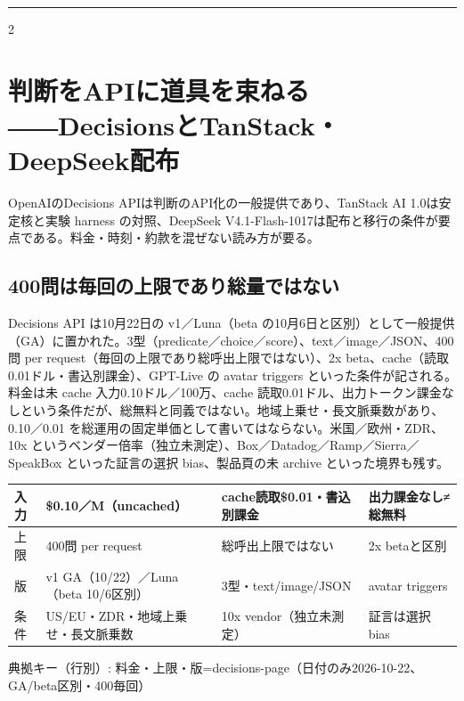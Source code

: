 \documentclass[lualatex,a4paper,10pt]{jlreq}
\begin{document}
\bigskip\hrule\bigskip %
\begin{multicols}{2} %


\section{判断をAPIに道具を束ねる――DecisionsとTanStack・DeepSeek配布}
\label{sec:P8}


OpenAIのDecisions APIは判断のAPI化の一般提供であり、TanStack AI 1.0は安定核と実験 harness の対照、DeepSeek V4.1-Flash-1017は配布と移行の条件が要点である。料金・時刻・約款を混ぜない読み方が要る。


\subsection*{400問は毎回の上限であり総量ではない}


Decisions API は10月22日の v1／Luna（beta の10月6日と区別）として一般提供（GA）に置かれた。3型（predicate／choice／score）、text／image／JSON、400問 per request（毎回の上限であり総呼出上限ではない）、2x beta、cache（読取0.01ドル・書込別課金）、GPT-Live の avatar triggers といった条件が記される。料金は未 cache 入力0.10ドル／100万、cache 読取0.01ドル、出力トークン課金なしという条件だが、総無料と同義ではない。地域上乗せ・長文脈乗数があり、0.10／0.01 を総運用の固定単価として書いてはならない。米国／欧州・ZDR、10x というベンダー倍率（独立未測定）、Box／Datadog／Ramp／Sierra／SpeakBox といった証言の選択 bias、製品頁の未 archive といった境界も残す。


\end{multicols} %
{\centering\footnotesize
{}
\begin{tabularx}{0.96\linewidth}{@{}lXXX@{}}
\toprule
入力 & \$0.10／M（uncached） & cache読取\$0.01・書込別課金 & 出力課金なし≠総無料 \\
\midrule
上限 & 400問 per request & 総呼出上限ではない & 2x betaと区別 \\
版 & v1 GA（10/22）／Luna（beta 10/6区別） & 3型・text/image/JSON & avatar triggers \\
条件 & US/EU・ZDR・地域上乗せ・長文脈乗数 & 10x vendor（独立未測定） & 証言は選択bias \\
\bottomrule
\end{tabularx}
{\scriptsize\color{SurveyMuted} 典拠キー（行別）: 料金・上限・版=decisions-page（日付のみ2026-10-22、GA/beta区別・400毎回）\par}
} %
\end{document}
